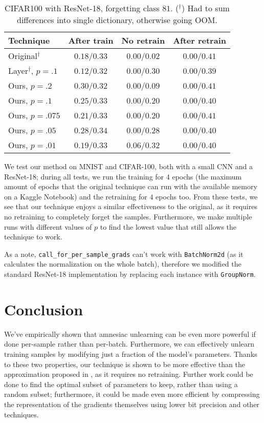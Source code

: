 \documentclass{article}
\begin{document}
\begin{table}
    \centering
    \caption{CIFAR100 with ResNet-18, forgetting class $81$. ($^\dagger$) Had to sum differences into single dictionary, otherwise going OOM.}
    \label{tab:cifar_resnet}
    \begin{tabular}{l | c | c c}
        Technique&After train&No retrain&After retrain\\
        \hline
        Original$^\dagger$&$0.18$/$0.33$&$0.00$/$0.02$&$0.00$/$0.41$\\
        Layer$^\dagger$, $p=.1$&$0.12$/$0.32$&$0.00$/$0.30$&$0.00$/$0.39$\\
        \hline
        Ours, $p=.2$&$0.30$/$0.32$&$0.00$/$0.09$&$0.00$/$0.41$\\
        Ours, $p=.1$&$0.25$/$0.33$&$0.00$/$0.20$&$0.00$/$0.40$\\
        Ours, $p=.075$&$0.21$/$0.33$&$0.00$/$0.20$&$0.00$/$0.41$\\
        Ours, $p=.05$&$0.28$/$0.34$&$0.00$/$0.28$&$0.00$/$0.40$\\
        Ours, $p=.01$&$0.19$/$0.33$&$0.06$/$0.32$&$0.00$/$0.40$\\
    \end{tabular}
\end{table}

We test our method on MNIST and CIFAR-100, both with a small CNN and a ResNet-18; during all tests, we run the training for $4$ epochs (the maximum amount of epochs that the original technique can run with the available memory on a Kaggle Notebook) and the retraining for $4$ epochs too. From these tests, we see that our technique enjoys a similar effectiveness to the original, as it requires no retraining to completely forget the samples. Furthermore, we make multiple runs with different values of $p$ to find the lowest value that still allows the technique to work.

As a note, \texttt{call\_for\_per\_sample\_grads} can't work with \texttt{BatchNorm2d} (as it calculates the normalization on the whole batch), therefore we modified the standard ResNet-18 implementation by replacing each instance with \texttt{GroupNorm}.

\section{Conclusion}
We've empirically shown that amnesiac unlearning can be even more powerful if done per-sample rather than per-batch. Furthermore, we can effectively unlearn training samples by modifying just a fraction of the model's parameters. Thanks to these two properties, our technique is shown to be more effective than the approximation proposed in \cite{gogineni2024efficient}, as it requires no retraining. Further work could be done to find the optimal subset of parameters to keep, rather than using a random subset; furthermore, it could be made even more efficient by compressing the representation of the gradients themselves using lower bit precision and other techniques.



\end{document}
